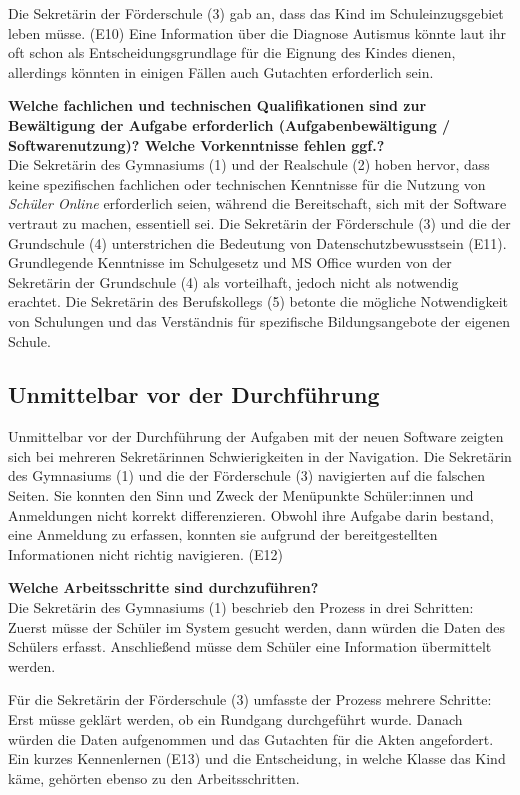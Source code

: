 Die Sekretärin der Förderschule (3) gab an, dass das Kind im Schuleinzugsgebiet leben müsse. (E10) Eine Information über die Diagnose Autismus könnte laut ihr oft schon als Entscheidungsgrundlage für die Eignung des Kindes dienen, allerdings könnten in einigen Fällen auch Gutachten erforderlich sein.

\textbf{Welche fachlichen und technischen Qualifikationen sind zur Bewältigung der Aufgabe erforderlich (Aufgabenbewältigung / Softwarenutzung)? Welche Vorkenntnisse fehlen ggf.?}\\
Die Sekretärin des Gymnasiums (1) und der Realschule (2) hoben hervor, dass keine spezifischen fachlichen oder technischen Kenntnisse für die Nutzung von \textit{Schüler Online} erforderlich seien, während die Bereitschaft, sich mit der Software vertraut zu machen, essentiell sei. Die Sekretärin der Förderschule (3) und die der Grundschule (4) unterstrichen die Bedeutung von Datenschutzbewusstsein (E11). Grundlegende Kenntnisse im Schulgesetz und MS Office wurden von der Sekretärin der Grundschule (4) als vorteilhaft, jedoch nicht als notwendig erachtet. Die Sekretärin des Berufskollegs (5) betonte die mögliche Notwendigkeit von Schulungen und das Verständnis für spezifische Bildungsangebote der eigenen Schule.

\subsection{Unmittelbar vor der Durchführung}
Unmittelbar vor der Durchführung der Aufgaben mit der neuen Software zeigten sich bei mehreren Sekretärinnen Schwierigkeiten in der Navigation. Die Sekretärin des Gymnasiums (1) und die der Förderschule (3) navigierten auf die falschen Seiten. Sie konnten den Sinn und Zweck der Menüpunkte \glqq Schüler:innen\grqq{} und \glqq Anmeldungen\grqq{} nicht korrekt differenzieren. Obwohl ihre Aufgabe darin bestand, eine Anmeldung zu erfassen, konnten sie aufgrund der bereitgestellten Informationen nicht richtig navigieren. (E12)

\textbf{Welche Arbeitsschritte sind durchzuführen?}\\
Die Sekretärin des Gymnasiums (1) beschrieb den Prozess in drei Schritten: Zuerst müsse der Schüler im System gesucht werden, dann würden die Daten des Schülers erfasst. Anschließend müsse dem Schüler eine Information übermittelt werden.

Für die Sekretärin der Förderschule (3) umfasste der Prozess mehrere Schritte: Erst müsse geklärt werden, ob ein Rundgang durchgeführt wurde. Danach würden die Daten aufgenommen und das Gutachten für die Akten angefordert. Ein kurzes Kennenlernen (E13) und die Entscheidung, in welche Klasse das Kind käme, gehörten ebenso zu den Arbeitsschritten. 

